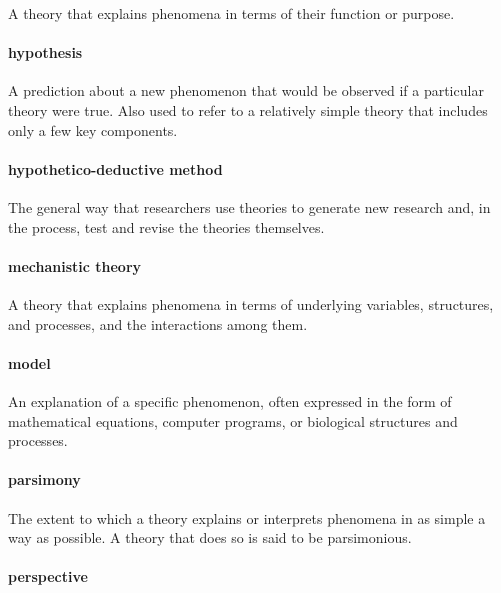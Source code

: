 \documentclass[
]{krantz}
\begin{document}
A theory that explains phenomena in terms of their function or purpose.

\paragraph*{hypothesis}\label{hypothesis}

A prediction about a new phenomenon that would be observed if a particular theory were true. Also used to refer to a relatively simple theory that includes only a few key components.

\paragraph*{hypothetico-deductive method}\label{hypothetico-deductive-method}

The general way that researchers use theories to generate new research and, in the process, test and revise the theories themselves.

\paragraph*{mechanistic theory}\label{mechanistic-theory}

A theory that explains phenomena in terms of underlying variables, structures, and processes, and the interactions among them.

\paragraph*{model}\label{model}

An explanation of a specific phenomenon, often expressed in the form of mathematical equations, computer programs, or biological structures and processes.

\paragraph*{parsimony}\label{parsimony}

The extent to which a theory explains or interprets phenomena in as simple a way as possible. A theory that does so is said to be parsimonious.

\paragraph*{perspective}\label{perspective}
\end{document}
